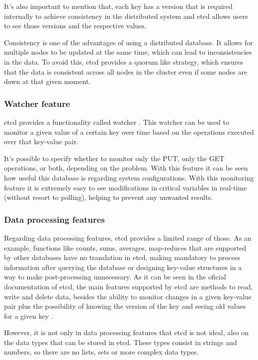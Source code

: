 \documentclass[screen,review]{acmart}
\begin{document}
It's also important to mention that, each key has a version that is required internally to achieve consistency in the distributed system and etcd allows users to see those versions and the respective values.

Consistency is one of the advantages of using a distributed database. It allows for multiple nodes to be updated at the same time, which can lead to inconsistencies in the data. To avoid this, etcd provides a quorum like strategy, which ensures that the data is consistent across all nodes in the cluster even if some nodes are down at that given moment\cite{etcd_api}.

\subsubsection{Watcher feature}
etcd provides a functionality called watcher \cite{etcd_watcher}. This watcher can be used to monitor a given value of a certain key over time based on the operations executed over that key-value pair.

It's possible to specify whether to monitor only the PUT, only the GET operations, or both, depending on the problem.
With this feature it can be seen how useful this database is regarding system configurations. With this monitoring feature it is extremely easy to see modifications in critical variables in real-time (without resort to polling), helping to prevent any unwanted results.

\subsubsection{Data processing features}
Regarding data processing features, etcd provides a limited range of those. As an example, functions like counts, sums, averages, map-reduces that are supported by other databases have no translation in etcd, making mandatory to process information after querying the database or designing key-value structures in a way to make post-processing unnecessary.
As it can be seen in the oficial documentation of etcd, the main features supported by etcd are methods to read, write and delete data, besides the ability to monitor changes in a given key-value pair plus the possibility of knowing the version of the key and seeing old values for a given key \cite{etcd_interacting} \cite{etcd_api}.

However, it is not only in data processing features that etcd is not ideal, also on the data types that can be stored in etcd. These types consist in strings and numbers, so there are no lists, sets or more complex data types.
\end{document}
